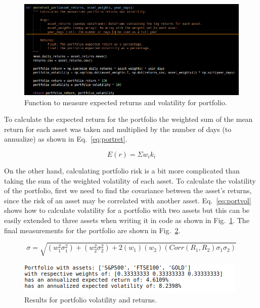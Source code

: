 \begin{figure}[H]
\centering
  \includegraphics[scale = .55]{imgs/annvolret.png}
  \caption{Function to measure expected returns and volatility for portfolio.}
  \label{fig:annretport}
\end{figure}

\noindent
To calculate the expected return for the portfolio the weighted sum of the mean return for each asset was taken and multiplied by the number of days (to annualize) as shown in Eq.~\ref{eq:portret}.  

\begin{equation} \label{eq:portret}
   E(r) = \Sigma w_i k_i
\end{equation}

\noindent
On the other hand, calculating portfolio risk is a bit more complicated than taking the sum of the weighted volatility of each asset. To calculate the volatility of the portfolio, first we need to find the covariance between the asset's returns, since the risk of an asset may be correlated with another asset. Eq.~\ref{eq:portvol} shows how to calculate volatility for a portfolio with two assets but this can be easily extended to three assets when writing it in code as shown in Fig.~\ref{fig:annretport}. The final measurements for the portfolio are shown in Fig.~\ref{fig:portretvolresults}. 

\begin{equation} \label{eq:portvol}
   \sigma = \sqrt{(w_1^2 \sigma_1^2) + (w_2^2 \sigma_2^2) + 2 (w_1) (w_2) (Corr(R_1, R_2) \sigma_1 \sigma_2)}     
\end{equation}

\begin{figure}[H]
\centering
  \includegraphics[scale = .75]{imgs/portretvolresults.png}
  \caption{Results for portfolio volatility and returns.}
  \label{fig:portretvolresults}
\end{figure}

